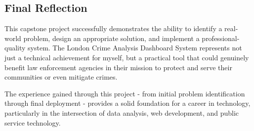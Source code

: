 \documentclass[12pt,a4paper]{article}
\begin{document}
\subsection{Final Reflection}

This capstone project successfully demonstrates the ability to identify a real-world problem, design an appropriate solution, 
and implement a professional-quality system. The London Crime Analysis Dashboard System represents not just a technical achievement for myself, 
but a practical tool that could genuinely benefit law enforcement agencies in their mission to protect and serve their communities or even mitigate crimes.

The experience gained through this project - from initial problem identification through final deployment - provides a solid foundation for a career in 
technology, particularly in the intersection of data analysis, web development, and public service technology.
\end{document}
